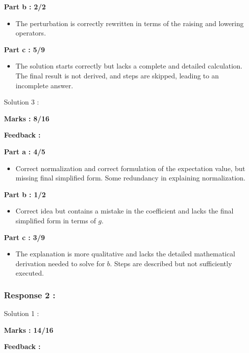 \documentclass[a4paper,11pt]{article}
\begin{document}
\textbf{Part b : 2/2}

\begin{itemize}
    \item The perturbation is correctly rewritten in terms of the raising and lowering operators.
\end{itemize}

\textbf{Part c : 5/9}

\begin{itemize}
    \item The solution starts correctly but lacks a complete and detailed calculation. The final result is not derived, and steps are skipped, leading to an incomplete answer.
\end{itemize}



Solution 3 :

\textbf{Marks : 8/16}

\textbf{Feedback :}

\textbf{Part a : 4/5}

\begin{itemize}
    \item Correct normalization and correct formulation of the expectation value, but missing final simplified form. Some redundancy in explaining normalization.
\end{itemize}

\textbf{Part b : 1/2}

\begin{itemize}
    \item Correct idea but contains a mistake in the coefficient and lacks the final simplified form in terms of $g$.
\end{itemize}

\textbf{Part c : 3/9}

\begin{itemize}
    \item The explanation is more qualitative and lacks the detailed mathematical derivation needed to solve for $b$. Steps are described but not sufficiently executed.
\end{itemize}


\subsubsection*{Response 2 :}

Solution 1 :

\textbf{Marks : 14/16}

\textbf{Feedback :}
\end{document}

